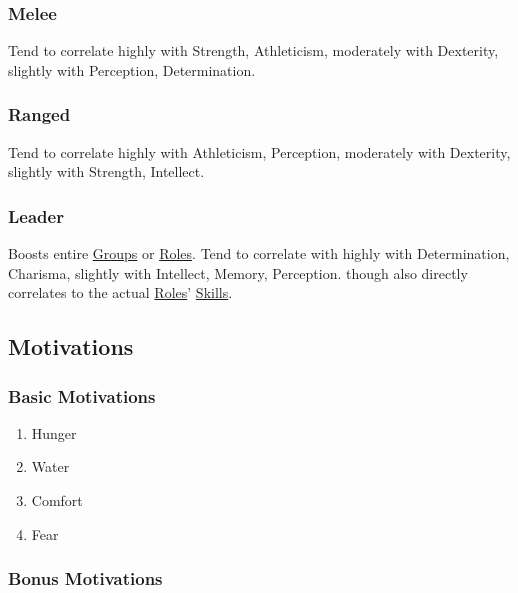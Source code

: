 \documentclass[11pt]{article}
\begin{document}
\subsubsection{Melee \label{org082746d} \label{org25bdb6e}}
\label{sec:orgb0ae8c5}
Tend to correlate highly with Strength, Athleticism, moderately with Dexterity, slightly with Perception, Determination.\\
\subsubsection{Ranged \label{org14916a2} \label{org054ca37}}
\label{sec:org480059e}
Tend to correlate highly with Athleticism, Perception, moderately with Dexterity, slightly with Strength, Intellect.\\
\subsubsection{Leader \label{org990bdda} \label{org841e9de}}
\label{sec:org232428b}
Boosts entire \hyperref[org21e4d88]{Groups} or \hyperref[org080bb13]{Roles}. Tend to correlate with highly with Determination, Charisma, slightly with Intellect, Memory, Perception. though also directly correlates to the actual \hyperref[org080bb13]{Roles}' \hyperref[org58ad070]{Skills}.\\
\subsection{Motivations}
\label{sec:org632ae76}
\subsubsection{Basic Motivations}
\label{sec:org564be7c}
\begin{enumerate}
\item Hunger
\label{sec:orgca6d0b8}
\item Water
\label{sec:orgd254571}
\item Comfort
\label{sec:org48f7ffb}
\item Fear
\label{sec:org3a2fa03}
\end{enumerate}
\subsubsection{Bonus Motivations}
\label{sec:orgff22821}
\end{document}
